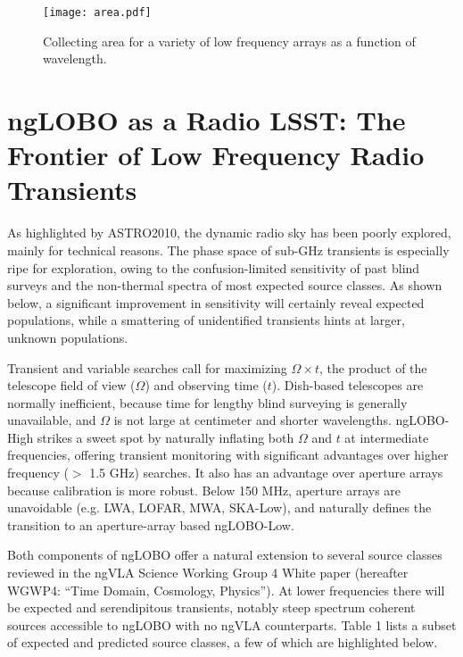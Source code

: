 \documentclass[11pt]{article}
\begin{document}
\begin{figure}[h!]
\begin{center}
\vspace{-1cm}
\texttt{[image: area.pdf]}
\end{center}
\vspace{-0.5cm}
  \caption{
Collecting area for a variety of low frequency arrays as a function of wavelength.
}
\label{area}
\end{figure}


\vspace{-0.5cm}
\section{ngLOBO as a Radio LSST: The Frontier of Low Frequency Radio Transients}
\vspace{-0.25cm}

As highlighted by ASTRO2010, the dynamic radio sky has been poorly explored, mainly for technical reasons. The phase space of sub-GHz transients is especially ripe for exploration, owing to the confusion-limited sensitivity of past blind surveys and the non-thermal spectra of most expected source classes. As shown below, a significant improvement in sensitivity will certainly reveal expected populations, while a smattering of unidentified transients hints at larger, unknown populations. 

Transient and variable searches call for maximizing $\Omega \times t$, the product of the telescope field of view ($\Omega$) and observing time ($t$). Dish-based telescopes are normally inefficient, because time for lengthy blind surveying is generally unavailable, and $\Omega$ is not large at centimeter and shorter wavelengths. ngLOBO-High strikes a sweet spot by naturally inflating both $\Omega$ and $t$ at intermediate frequencies, offering transient monitoring with significant advantages over higher frequency ($>$ 1.5 GHz) searches.  It also has an advantage over aperture arrays because calibration is more robust.  Below 150 MHz, aperture arrays are unavoidable (e.g. LWA, LOFAR, MWA, SKA-Low), and naturally defines the transition to an aperture-array based ngLOBO-Low.

Both components of ngLOBO offer a natural extension to several source classes reviewed in the ngVLA Science Working Group 4 White paper (hereafter WGWP4: ``Time Domain,  Cosmology, Physics''). At lower frequencies there will be expected and serendipitous transients, notably steep spectrum coherent sources accessible to ngLOBO with no ngVLA counterparts. Table 1 lists a subset of expected and predicted source classes, a few of which are highlighted  below.
\end{document}
